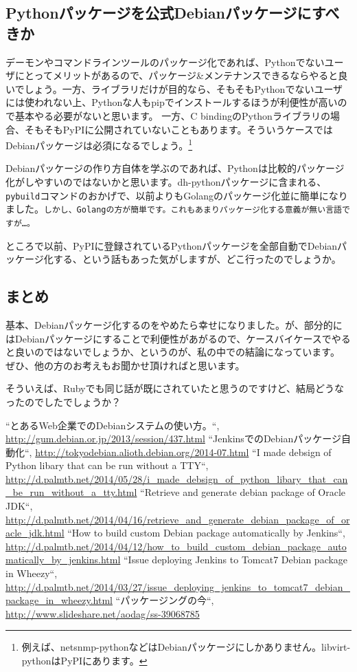 \documentclass[mingoth,a4paper]{jsarticle}
\begin{document}
\subsection{Pythonパッケージを公式Debianパッケージにすべきか}
デーモンやコマンドラインツールのパッケージ化であれば、Pythonでないユーザにとってメリットがあるので、パッケージ\&メンテナンスできるならやると良いでしょう。一方、ライブラリだけが目的なら、そもそもPythonでないユーザには使われない上、Pythonな人もpipでインストールするほうが利便性が高いので基本やる必要がないと思います。
一方、C bindingのPythonライブラリの場合、そもそもPyPIに公開されていないこともあります。そういうケースではDebianパッケージは必須になるでしょう。\footnote{例えば、netsnmp-pythonなどはDebianパッケージにしかありません。libvirt-pythonはPyPIにあります。}

Debianパッケージの作り方自体を学ぶのであれば、Pythonは比較的パッケージ化がしやすいのではないかと思います。dh-pythonパッケージに含まれる、\texttt{pybuild}コマンドのおかげで、以前よりもGolangのパッケージ化並に簡単になりました。\texttt{しかし、Golangの方が簡単です。これもあまりパッケージ化する意義が無い言語ですが…。}


ところで以前、PyPIに登録されているPythonパッケージを全部自動でDebianパッケージ化する、という話もあった気がしますが、どこ行ったのでしょうか。

\subsection{まとめ}

基本、Debianパッケージ化するのをやめたら幸せになりました。が、部分的にはDebianパッケージにすることで利便性があがるので、ケースバイケースでやると良いのではないでしょうか、というのが、私の中での結論になっています。
ぜひ、他の方のお考えもお聞かせ頂ければと思います。

そういえば、Rubyでも同じ話が既にされていたと思うのですけど、結局どうなったのでしたでしょうか？

{\scriptsize
\begin{thebibliography}{9}
``とあるWeb企業でのDebianシステムの使い方。``, \url{http://gum.debian.or.jp/2013/session/437.html}
  \label{deb}
``JenkinsでのDebianパッケージ自動化``, \url{http://tokyodebian.alioth.debian.org/2014-07.html}
  \label{debci}
``I made debsign of Python libary that can be run without a TTY``, \url{http://d.palmtb.net/2014/05/28/i_made_debsign_of_python_libary_that_can_be_run_without_a_tty.html}
  \label{pydebsign}
  ``Retrieve and generate debian package of Oracle JDK``, \url{http://d.palmtb.net/2014/04/16/retrieve_and_generate_debian_package_of_oracle_jdk.html}
  ``How to build custom Debian package automatically by Jenkins``, \url{http://d.palmtb.net/2014/04/12/how_to_build_custom_debian_package_automatically_by_jenkins.html}
  ``Issue deploying Jenkins to Tomcat7 Debian package in Wheezy``, \url{http://d.palmtb.net/2014/03/27/issue_deploying_jenkins_to_tomcat7_debian_package_in_wheezy.html}
  ``パッケージングの今``, \url{http://www.slideshare.net/aodag/ss-39068785}
    \label{pythonpackage}
\end{thebibliography}
}
\end{document}
